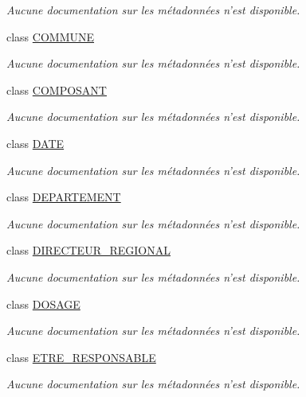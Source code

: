 \begin{DoxyCompactItemize}
\begin{DoxyCompactList}\small\item\em Aucune documentation sur les métadonnées n'est disponible. \end{DoxyCompactList}\item 
class \hyperlink{class_model_1_1_c_o_m_m_u_n_e}{C\-O\-M\-M\-U\-N\-E}
\begin{DoxyCompactList}\small\item\em Aucune documentation sur les métadonnées n'est disponible. \end{DoxyCompactList}\item 
class \hyperlink{class_model_1_1_c_o_m_p_o_s_a_n_t}{C\-O\-M\-P\-O\-S\-A\-N\-T}
\begin{DoxyCompactList}\small\item\em Aucune documentation sur les métadonnées n'est disponible. \end{DoxyCompactList}\item 
class \hyperlink{class_model_1_1_d_a_t_e}{D\-A\-T\-E}
\begin{DoxyCompactList}\small\item\em Aucune documentation sur les métadonnées n'est disponible. \end{DoxyCompactList}\item 
class \hyperlink{class_model_1_1_d_e_p_a_r_t_e_m_e_n_t}{D\-E\-P\-A\-R\-T\-E\-M\-E\-N\-T}
\begin{DoxyCompactList}\small\item\em Aucune documentation sur les métadonnées n'est disponible. \end{DoxyCompactList}\item 
class \hyperlink{class_model_1_1_d_i_r_e_c_t_e_u_r___r_e_g_i_o_n_a_l}{D\-I\-R\-E\-C\-T\-E\-U\-R\-\_\-\-R\-E\-G\-I\-O\-N\-A\-L}
\begin{DoxyCompactList}\small\item\em Aucune documentation sur les métadonnées n'est disponible. \end{DoxyCompactList}\item 
class \hyperlink{class_model_1_1_d_o_s_a_g_e}{D\-O\-S\-A\-G\-E}
\begin{DoxyCompactList}\small\item\em Aucune documentation sur les métadonnées n'est disponible. \end{DoxyCompactList}\item 
class \hyperlink{class_model_1_1_e_t_r_e___r_e_s_p_o_n_s_a_b_l_e}{E\-T\-R\-E\-\_\-\-R\-E\-S\-P\-O\-N\-S\-A\-B\-L\-E}
\begin{DoxyCompactList}\small\item\em Aucune documentation sur les métadonnées n'est disponible. \end{DoxyCompactList}\item 

\end{DoxyCompactItemize}
